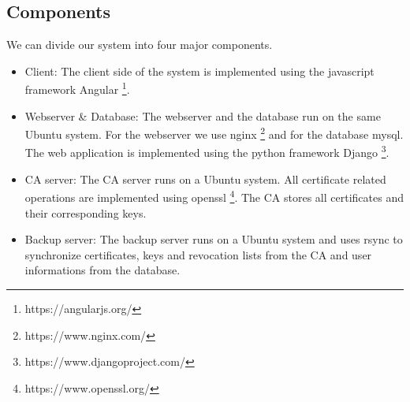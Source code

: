 \documentclass[english]{article}
\begin{document}









\subsection{Components}

We can divide our system into four major components.
\begin{itemize}
\item Client: The client side of the system is implemented using the javascript framework Angular \footnote{https://angularjs.org/}.
\item Webserver \& Database: The webserver and the database run on the same Ubuntu system. For the webserver we use nginx \footnote{https://www.nginx.com/} and for the database mysql. The web application is implemented using the python framework Django \footnote{https://www.djangoproject.com/}.
\item CA server: The CA server runs on a Ubuntu system. All certificate related operations are implemented using openssl \footnote{https://www.openssl.org/}. The CA stores all certificates and their corresponding keys.
\item Backup server: The backup server runs on a Ubuntu system and uses rsync to synchronize certificates, keys and revocation lists from the CA and user informations from the database.
\end{itemize}

  
\end{document}
